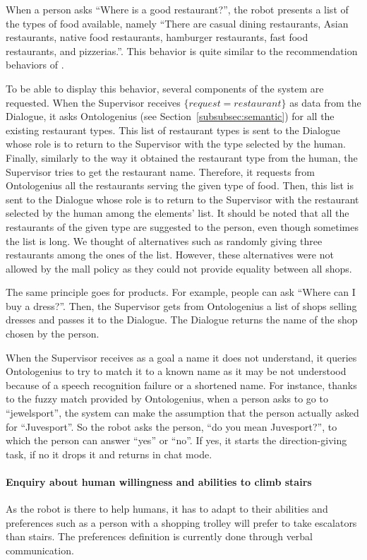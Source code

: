\documentclass[a4paper,11pt,twoside]{StyleThese}
\begin{document}
When a person asks ``Where is a good restaurant?'', the robot presents a list of the types of food available, namely ``There are casual dining restaurants, Asian restaurants, native food restaurants, hamburger restaurants, fast food restaurants, and pizzerias.''. This behavior is quite similar to the recommendation behaviors of \cite{kanda_2009_affective}.

To be able to display this behavior, several components of the system are requested. When the Supervisor receives $\{request=restaurant\}$ as data from the Dialogue, it asks Ontologenius (see Section~\ref{subsubsec:semantic}) for all the existing restaurant types. This list of restaurant types is sent to the Dialogue whose role is to return to the Supervisor with the type selected by the human. Finally, similarly to the way it obtained the restaurant type from the human, the Supervisor tries to get the restaurant name. Therefore, it requests from Ontologenius all the restaurants serving the given type of food. Then, this list is sent to the Dialogue whose role is to return to the Supervisor with the restaurant selected by the human among the elements' list. It should be noted that all the restaurants of the given type are suggested to the person, even though sometimes the list is long. We thought of alternatives such as randomly giving three restaurants among the ones of the list. However, these alternatives were not allowed by the mall policy as they could not provide equality between all shops. 

The same principle goes for products. For example, people can ask ``Where can I buy a dress?''. Then, the Supervisor gets from Ontologenius a list of shops selling dresses and passes it to the Dialogue. The Dialogue returns the name of the shop chosen by the person.

When the Supervisor receives as a goal a name it does not understand, it queries Ontologenius to try to match it to a known name as it may be not understood because of a speech recognition failure or a shortened name. For instance, thanks to the fuzzy match provided by Ontologenius, when a person asks to go to ``jewelsport'', the system can make the assumption that the person actually asked for ``Juvesport''. So the robot asks the person, ``do you mean Juvesport?'', to which the person can answer ``yes'' or ``no''. If yes, it starts the direction-giving task, if no it drops it and returns in chat mode.

\paragraph{Enquiry about human willingness and abilities to climb stairs}
As the robot is there to help humans, it has to adapt to their abilities and preferences such as a person with a shopping trolley will prefer to take escalators than stairs. The preferences definition is currently done through verbal communication.
\end{document}
